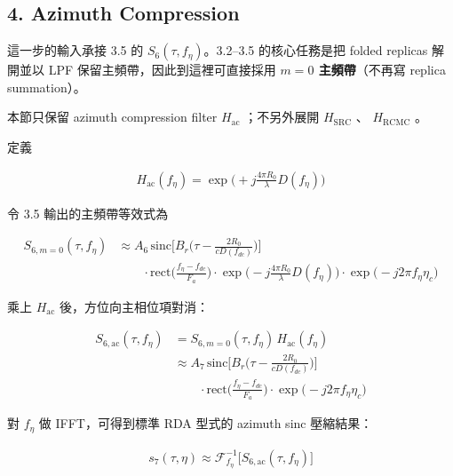 \documentclass[11pt]{article}
\begin{document}
\hypertarget{azimuth-compression}{%
\subsection{4. Azimuth Compression}\label{azimuth-compression}}

這一步的輸入承接 3.5 的 \(S_6(\tau,f_\eta)\)。3.2--3.5 的核心任務是把
folded replicas 解開並以 LPF 保留主頻帶，因此到這裡可直接採用
\textbf{\(m=0\) 主頻帶}（不再寫 replica summation）。

本節只保留 azimuth compression filter \(H_{\mathrm{ac}}\) ；不另外展開
\(H_{\mathrm{SRC}}\) 、 \(H_{\mathrm{RCMC}}\) 。

定義

\begin{equation}
\begin{aligned} H_{\mathrm{ac}}(f_\eta) = \exp\biggl(+j\frac{4\pi R_0}{\lambda}D(f_\eta)\biggr) \end{aligned}
\end{equation}

令 3.5 輸出的主頻帶等效式為

\begin{equation}
\begin{aligned}
S_{6,m=0}(\tau,f_\eta)
&\approx
A_6\,
\mathrm{sinc}\biggl[B_r\biggl(\tau-\frac{2R_0}{cD(f_{dc})}\biggr)\biggr]\\
&\qquad \cdot \mathrm{rect}\biggl(\frac{f_\eta-f_{dc}}{F_a}\biggr)
\cdot \exp\biggl(-j\frac{4\pi R_0}{\lambda}D(f_\eta)\biggr)
\cdot \exp\biggl(-j2\pi f_\eta\eta_c\biggr)
\end{aligned}
\end{equation}

乘上 \(H_{\mathrm{ac}}\) 後，方位向主相位項對消：

\begin{equation}
\begin{aligned}
S_{6,\mathrm{ac}}(\tau,f_\eta)
&=
S_{6,m=0}(\tau,f_\eta)\,H_{\mathrm{ac}}(f_\eta)\\
&\approx
A_7\,
\mathrm{sinc}\biggl[B_r\biggl(\tau-\frac{2R_0}{cD(f_{dc})}\biggr)\biggr]\\
&\qquad \cdot \mathrm{rect}\biggl(\frac{f_\eta-f_{dc}}{F_a}\biggr)
\cdot \exp\biggl(-j2\pi f_\eta\eta_c\biggr)
\end{aligned}
\end{equation}

對 \(f_\eta\) 做 IFFT，可得到標準 RDA 型式的 azimuth sinc 壓縮結果：

\begin{equation}
\begin{aligned}
s_7(\tau,\eta) \approx \mathcal{F}^{-1}_{f_\eta}\biggl[ S_{6,\mathrm{ac}}(\tau,f_\eta) \biggr]
\end{aligned}
\end{equation}
\end{document}
